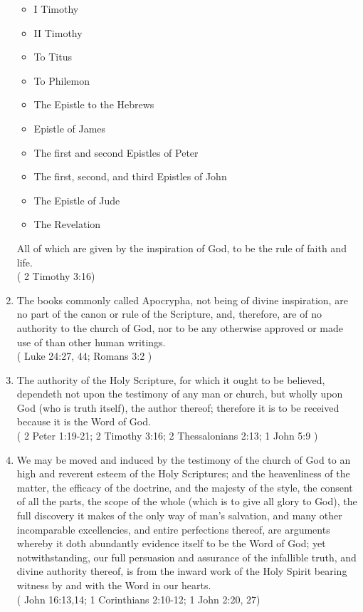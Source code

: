 \documentclass[12pt,a4paper]{book}
\begin{document}
\begin{enumerate}
\begin{itemize}
\item I Timothy
\item II Timothy
\item To Titus
\item To Philemon
\item The Epistle to the Hebrews
\item Epistle of James
\item The first and second Epistles of Peter
\item The first, second, and third Epistles of John
\item The Epistle of Jude
\item The Revelation
\end{itemize}
All of which are given by the inspiration of God, to be the rule of faith and life.\\
( 2 Timothy 3:16)
\item The books commonly called Apocrypha, not being of divine inspiration, are no part of the canon or rule of the Scripture, and, therefore, are of no authority to the church of God, nor to be any otherwise approved or made use of than other human writings.\\
( Luke 24:27, 44; Romans 3:2 )
\item The authority of the Holy Scripture, for which it ought to be believed, dependeth not upon the testimony of any man or church, but wholly upon God (who is truth itself), the author thereof; therefore it is to be received because it is the Word of God.\\
( 2 Peter 1:19-21; 2 Timothy 3:16; 2 Thessalonians 2:13; 1 John 5:9 )
\item We may be moved and induced by the testimony of the church of God to an high and reverent esteem of the Holy Scriptures; and the heavenliness of the matter, the efficacy of the doctrine, and the majesty of the style, the consent of all the parts, the scope of the whole (which is to give all glory to God), the full discovery it makes of the only way of man's salvation, and many other incomparable excellencies, and entire perfections thereof, are arguments whereby it doth abundantly evidence itself to be the Word of God; yet notwithstanding, our full persuasion and assurance of the infallible truth, and divine authority thereof, is from the inward work of the Holy Spirit bearing witness by and with the Word in our hearts.\\
( John 16:13,14; 1 Corinthians 2:10-12; 1 John 2:20, 27)

\end{enumerate}
\end{document}
